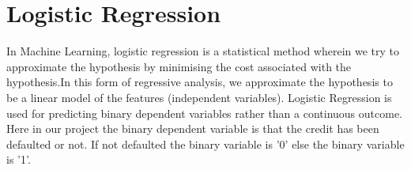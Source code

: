 \section{ Logistic Regression } 
\par In Machine Learning, logistic regression is a statistical method wherein we try to approximate the hypothesis by minimising the cost associated with the hypothesis.In this form of regressive analysis, we approximate the hypothesis to be a linear model of the features (independent variables). Logistic Regression is used for predicting binary dependent variables rather than a continuous outcome. Here in our project the binary dependent variable is that the credit has been defaulted or not. If not defaulted the binary variable is '0' else the binary variable is '1'. ~\cite{al2002using}

